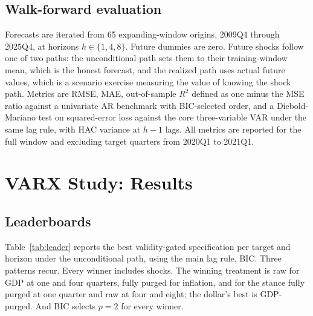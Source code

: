 \documentclass[conference]{IEEEtran}
\begin{document}
\subsection{Walk-forward evaluation}
Forecasts are iterated from 65 expanding-window origins, 2009Q4 through 2025Q4, at horizons $h \in \{1,4,8\}$. Future dummies are zero. Future shocks follow one of two paths: the unconditional path sets them to their training-window mean, which is the honest forecast, and the realized path uses actual future values, which is a scenario exercise measuring the value of knowing the shock path. Metrics are RMSE, MAE, out-of-sample $R^2$ defined as one minus the MSE ratio against a univariate AR benchmark with BIC-selected order, and a Diebold-Mariano test \cite{dm1995} on squared-error loss against the core three-variable VAR under the same lag rule, with HAC variance at $h-1$ lags. All metrics are reported for the full window and excluding target quarters from 2020Q1 to 2021Q1.

\section{VARX Study: Results}

\subsection{Leaderboards}
Table~\ref{tab:leader} reports the best validity-gated specification per target and horizon under the unconditional path, using the main lag rule, BIC. Three patterns recur. Every winner includes shocks. The winning treatment is raw for GDP at one and four quarters, fully purged for inflation, and for the stance fully purged at one quarter and raw at four and eight; the dollar's best is GDP-purged. And BIC selects $p=2$ for every winner.
\end{document}
